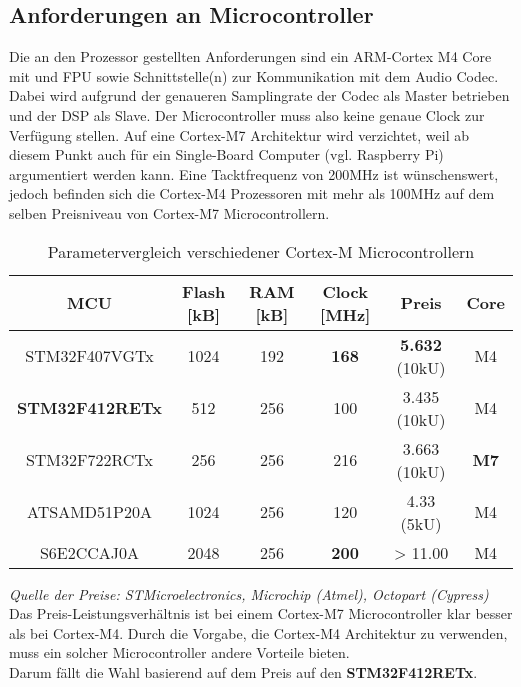 \subsection{Anforderungen an Microcontroller}
\label{sec:Konzept_Microcontroller}

Die an den Prozessor gestellten Anforderungen sind ein ARM-Cortex M4 Core mit und FPU sowie Schnittstelle(n) zur Kommunikation mit dem Audio Codec. 
Dabei wird aufgrund der genaueren Samplingrate der Codec als Master betrieben und der DSP als Slave.
Der Microcontroller muss also keine genaue Clock zur Verfügung stellen. 
Auf eine Cortex-M7 Architektur wird verzichtet, weil ab diesem Punkt auch für ein Single-Board Computer (vgl. Raspberry Pi) argumentiert werden kann.
Eine Tacktfrequenz von 200MHz ist wünschenswert, jedoch befinden sich die Cortex-M4 Prozessoren mit mehr als 100MHz auf dem selben Preisniveau von Cortex-M7 Microcontrollern.

\begin{table}[H]
	\centering
	\begin{tabular}{|c|c|c|c|c|c|}
		\hline
		\textbf{MCU}  & \textbf{Flash {[}kB{]}} & \textbf{RAM {[}kB{]}} & \textbf{Clock {[}MHz{]}} & \textbf{Preis} & \textbf{Core} \\ \hline
		STM32F407VGTx & 1024                    & 192                   & \textbf{168}             & \textbf{5.632} (10kU) & M4            \\ \hline
		\textbf{STM32F412RETx} & 512            & 256                   & 100                      & 3.435 (10kU)        & M4            \\ \hline
		STM32F722RCTx & 256                     & 256                   & 216                      & 3.663 (10kU)        & \textbf{M7}   \\ \hline
		ATSAMD51P20A  & 1024                    & 256                   & 120                      & 4.33 (5kU)          & M4            \\
		\hline
		S6E2CCAJ0A    & 2048                    & 256                   & \textbf{200}             & > 11.00             & M4            \\
		\hline
	\end{tabular}
 	\caption{Parametervergleich verschiedener Cortex-M Microcontrollern}
 	\label{tab:ComparisonMCU}
\end{table}

\textit{Quelle der Preise: STMicroelectronics, Microchip (Atmel), Octopart (Cypress)} \\

Das Preis-Leistungsverhältnis ist bei einem Cortex-M7 Microcontroller klar besser als bei Cortex-M4. Durch die Vorgabe, die Cortex-M4 Architektur zu verwenden, muss ein solcher Microcontroller andere Vorteile bieten.\\
Darum fällt die Wahl basierend auf dem Preis auf den \textbf{STM32F412RETx}.


